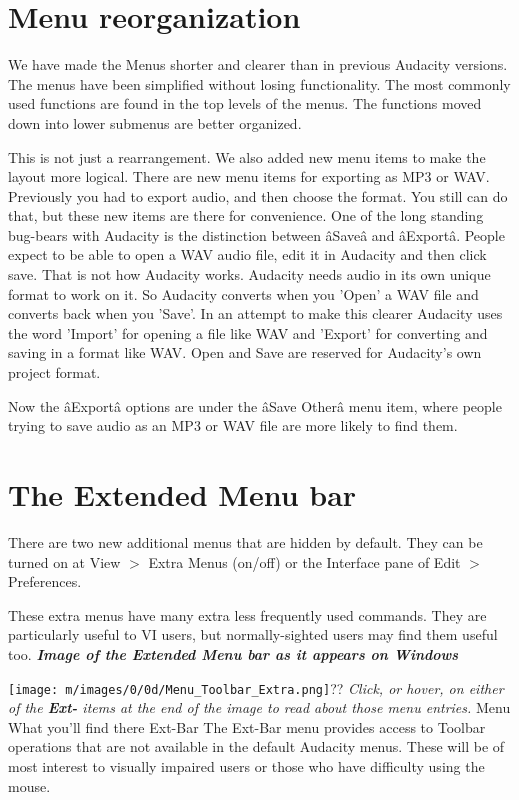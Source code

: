\section{Menu reorganization}


We have made the Menus shorter and clearer than in previous Audacity versions. The menus have been simplified without losing functionality. The most commonly used functions are found in the top levels of the menus. The functions moved down into lower submenus are better organized.

This is not just a rearrangement.  We also added new menu items to make the layout more logical.  There are new menu items for exporting as MP3 or WAV. Previously you had to export audio, and then choose the format. You still can do that, but these new items are there for convenience.
One of the long standing bug-bears with Audacity is the distinction between \^aSave\^a and \^aExport\^a. People expect to be able to open a WAV audio file, edit it in Audacity and then click save. That is not how Audacity works. Audacity needs audio in its own unique format to work on it. So Audacity converts when you 'Open' a WAV file and converts back when you 'Save'. In an attempt to make this clearer Audacity uses the word 'Import' for opening a file like WAV and 'Export' for converting and saving in a format like WAV. Open and Save are reserved for Audacity's own project format.

Now the \^aExport\^a options are under the \^aSave Other\^a menu item, where people trying to save audio as an MP3 or WAV file are more likely to find them. 


\section{The Extended Menu bar}


There are two new additional menus that are hidden by default.  They can be turned on at View \mbox{$>$} Extra Menus (on/off) or the Interface pane of Edit \mbox{$>$} Preferences.

These extra menus have many extra less frequently used commands.  They are particularly useful to VI users, but normally-sighted users may find them useful too.
\textit{\textbf{Image of the Extended Menu bar as it appears on Windows}}



\texttt{[image: m/images/0/0d/Menu\_Toolbar\_Extra.png]}??
\textit{Click, or hover, on either of the \textbf{Ext-} items at the end of the image to read about those menu entries.}
Menu
What you'll find there
Ext-Bar
The Ext-Bar menu provides access to Toolbar operations that are not available in the default Audacity menus. These will be of most interest to visually impaired users or those who have difficulty using the mouse.


